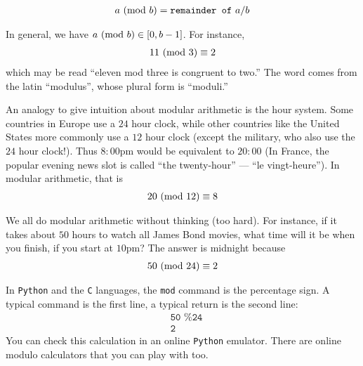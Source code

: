 \documentclass[12pt]{article}
\begin{document}
\begin{definition*}
\begin{align*}
a\ (\mathrm{mod}\ b) = \texttt{remainder of}~a/b
\end{align*}
\end{definition*}
In general, we have $a\ (\mathrm{mod}\ b)\in[0,b-1]$. For instance, 
\begin{align*}
11\ (\mathrm{mod}\ 3) \equiv 2
\end{align*}
which may be read ``eleven mod three is congruent to two.'' The word comes from the latin ``modulus'', whose plural form is ``moduli.'' 

An analogy to give intuition about modular arithmetic is the hour system. Some countries in Europe use a $24$ hour clock, while other countries like the United States more commonly use a $12$ hour clock (except the military, who also use the $24$ hour clock!). Thus $8{:}00$pm would be equivalent to $20{:}00$ (In France, the popular evening news slot is called ``the twenty-hour'' --- ``le vingt-heure''). In modular arithmetic, that is
\begin{align*}
20\ (\mathrm{mod}\ 12) \equiv 8
\end{align*}

We all do modular arithmetic without thinking (too hard). For instance, if it takes about $50$ hours to watch all James Bond movies, what time will it be when you finish, if you start at $10$pm? The answer is midnight because
\begin{align*}
50\ (\mathrm{mod}\ 24) \equiv 2
\end{align*}

In \texttt{Python} and the \texttt{C} languages, the \texttt{mod} command is the percentage sign. A typical command is the first line, a typical return is the second line:
\begin{align*}
& \texttt{50 \% 24}\\
& \texttt{2}
\end{align*}
You can check this calculation in an online \texttt{Python} emulator. There are online modulo calculators that you can play with too.
\end{document}
